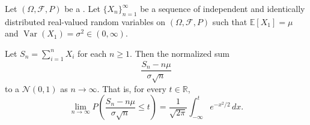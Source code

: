 \begin{theorem} \label{theorem:classical_central_limit_theorem_for_iid_random_variables}
Let $(\Omega, \mathcal{F}, P)$ be a . Let $\{X_n\}_{n=1}^\infty$ be a sequence of independent and identically distributed real-valued random variables on $(\Omega, \mathcal{F}, P)$ such that $\mathbb{E}[X_1] = \mu$ and $\operatorname{Var}(X_1) = \sigma^2 \in (0, \infty)$.

Let $S_n = \sum_{i=1}^n X_i$ for each $n \geq 1$. Then the normalized sum
$$\frac{S_n - n\mu}{\sigma\sqrt{n}}$$
 to a  $\mathcal{N}(0, 1)$ as $n \to \infty$. That is, for every $t \in \mathbb{R}$,
$$\lim_{n \to \infty} P\left(\frac{S_n - n\mu}{\sigma\sqrt{n}} \leq t\right) = \frac{1}{\sqrt{2\pi}} \int_{-\infty}^t e^{-x^2/2} \, dx.$$
\end{theorem}